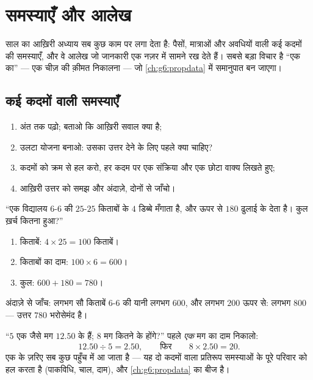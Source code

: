 \chapter{समस्याएँ और आलेख}\label{ch:g5:data}

साल का आख़िरी अध्याय सब कुछ काम पर लगा देता है: पैसों, मात्राओं
और अवधियों वाली कई कदमों की समस्याएँ, और वे आलेख जो जानकारी एक
नज़र में सामने रख देते हैं। सबसे बड़ा विचार है ``एक का'' ---
एक चीज़ की क़ीमत निकालना --- जो \cref{ch:g6:propdata} में
समानुपात बन जाएगा।

\section{कई कदमों वाली समस्याएँ}

\begin{method}[लंबी समस्या को साधना]\label{met:g5:data:steps}
\begin{enumerate}
  \item अंत तक पढ़ो; बताओ कि आख़िरी सवाल क्या है;
  \item उलटा योजना बनाओ: उसका उत्तर देने के लिए पहले क्या चाहिए?
  \item कदमों को क्रम से हल करो, हर कदम पर एक संक्रिया और एक
        छोटा वाक्य लिखते हुए;
  \item आख़िरी उत्तर को समझ और अंदाज़े, दोनों से जाँचो।
\end{enumerate}
\end{method}

\begin{example}\label{ex:g5:data:multistep}
``एक विद्यालय $6$-$6$ की $25$-$25$ किताबों के $4$ डिब्बे मँगाता
है, और ऊपर से $180$ ढुलाई के देता है। कुल ख़र्च कितना हुआ?''
\begin{enumerate}
  \item किताबें: $4 \times 25 = 100$ किताबें।
  \item किताबों का दाम: $100 \times 6 = 600$।
  \item कुल: $600 + 180 = 780$।
\end{enumerate}
अंदाज़े से जाँच: लगभग सौ किताबें $6$-$6$ की यानी लगभग $600$, और
लगभग $200$ ऊपर से: लगभग $800$ --- उत्तर $780$ भरोसेमंद है।
\end{example}

\begin{example}[एक का]\label{ex:g5:data:perone}
``$5$ एक जैसे मग $12.50$ के हैं; $8$ मग कितने के होंगे?''
पहले \emph{एक} मग का दाम निकालो:
\[
12.50 \div 5 = 2.50,
\qquad\text{फिर}\qquad
8 \times 2.50 = 20 .
\]
एक के ज़रिए सब कुछ पहुँच में आ जाता है --- यह दो कदमों वाला
प्रतिरूप समस्याओं के पूरे परिवार को हल करता है (पाकविधि, चाल,
दाम), और \cref{ch:g6:propdata} का बीज है।
\end{example}

